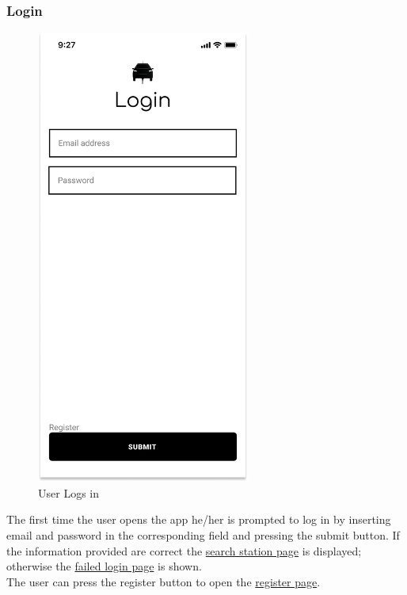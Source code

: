 \subsubsection{Login}
\begin{figure}[H]
    \centering
    \includegraphics[keepaspectratio, height=15cm]{Mockup/UserAppInterface/Login.png}
    \caption{User Logs in}
    \label{fig:Login}
\end{figure}
The first time the user opens the app he/her is prompted to log in by inserting email and password in the corresponding field and pressing the submit button. If the information provided are correct the \hyperref[fig:Search]{search station page} is displayed; otherwise the \hyperref[fig:FailedLogin]{failed login page} is shown.\\
The user can press the register button to open the \hyperref[fig:Register]{register page}.
